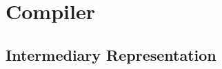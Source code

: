 \section{Compiler}
\label{sec:compiler}

\subsection{Intermediary Representation}
\label{sec:intermediary_representation}